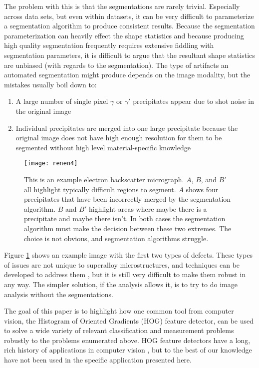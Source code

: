 \documentclass[review]{elsarticle}
\begin{document}
		The problem with this is that the segmentations are rarely trivial. Especially across data sets, but even within datasets, it can be very difficult to parameterize a segmentation algorithm to produce consistent results. Because the segmentation parameterization can heavily effect the shape statistics and because producing high quality segmentation frequently requires extensive fiddling with segmentation parameters, it is difficult to argue that the resultant shape statistics are unbiased (with regards to the segmentation). The type of artifacts an automated segmentation might produce depends on the image modality, but the mistakes usually boil down to:

		\begin{enumerate}
			\item \label{prob1} A large number of single pixel $\gamma$ or $\gamma'$ precipitates appear due to shot noise in the original image
			\item Individual precipitates are merged into one large precipitate because the original image does not have high enough resolution for them to be segmented without high level material-specific knowledge
		\end{enumerate}
	
		\begin{figure}[!ht]
	  		\centering
			\texttt{[image: renen4]}
	  		\caption{ This is an example electron backscatter micrograph. $A$, $B$, and $B'$ all highlight typically difficult regions to segment. $A$ shows four precipitates that have been incorrectly merged by the segmentation algorithm. $B$ and $B'$ highlight areas where maybe there is a precipitate and maybe there isn't. In both cases the segmentation algorithm must make the decision between these two extremes. The choice is not obvious, and segmentation algorithms struggle. }
	  		\label{figure1}
		\end{figure}

		Figure \ref{figure1} shows an example image with the first two types of defects. These types of issues are not unique to superalloy microstructures, and techniques can be developed to address them \cite{comer, marc1, marc2, marc3}, but it is still very difficult to make them robust in any way. The simpler solution, if the analysis allows it, is to try to do image analysis without the segmentations.
	

		The goal of this paper is to highlight how one common tool from computer vision, the Histogram of Oriented Gradients (HOG) feature detector, can be used to solve a wide variety of relevant classification and measurement problems robustly to the problems enumerated above. HOG feature detectors have a long, rich history of applications in computer vision \cite{gradtex, hog, girsh}, but to the best of our knowledge have not been used in the specific application presented here.
\end{document}
